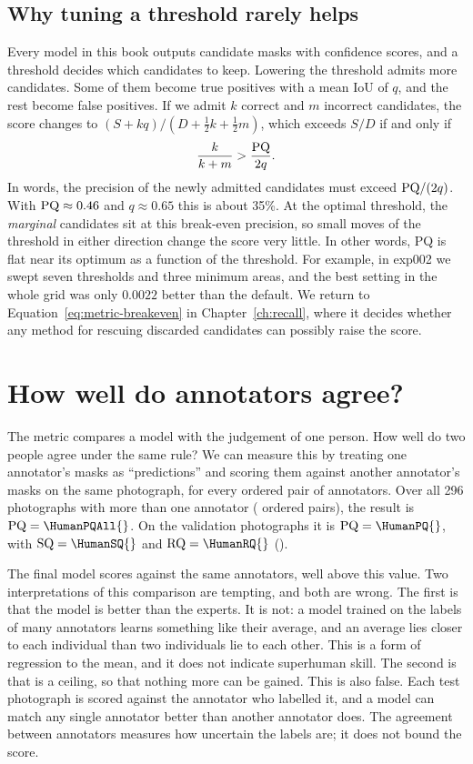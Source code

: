\subsection{Why tuning a threshold rarely helps}\label{sec:metric-threshold}
Every model in this book outputs candidate masks with confidence scores, and a threshold decides
which candidates to keep. Lowering the threshold admits more candidates. Some of them become true
positives with a mean IoU of $q$, and the rest become false positives. If we admit $k$ correct and
$m$ incorrect candidates, the score changes to $(S+kq)/(D+\tfrac12k+\tfrac12m)$, which exceeds
$S/D$ if and only if
\begin{equation}
\frac{k}{k+m}>\frac{\mathrm{PQ}}{2q}.
\label{eq:metric-breakeven}
\end{equation}
In words, the precision of the newly admitted candidates must exceed $\mathrm{PQ}/(2q)$. With
$\mathrm{PQ}\approx0.46$ and $q\approx0.65$ this is about 35\%. At the optimal threshold, the
\emph{marginal} candidates sit at this break-even precision, so small moves of the threshold in
either direction change the score very little. In other words, PQ is flat near its optimum as a
function of the threshold. For example, in exp002 we swept seven thresholds and three minimum
areas, and the best setting in the whole grid was only $0.0022$ better than the default. We return
to Equation~\eqref{eq:metric-breakeven} in Chapter~\ref{ch:recall}, where it decides whether any
method for rescuing discarded candidates can possibly raise the score.

\section{How well do annotators agree?}\label{sec:metric-agreement}
The metric compares a model with the judgement of one person. How well do two people agree under
the same rule? We can measure this by treating one annotator's masks as ``predictions'' and scoring
them against another annotator's masks on the same photograph, for every ordered pair of
annotators. Over all 296 photographs with more than one annotator (\HumanPairs{} ordered pairs),
the result is $\PQ=\HumanPQAll{}$. On the validation photographs it is $\PQ=\HumanPQ{}$, with
$\SQ=\HumanSQ{}$ and $\RQ=\HumanRQ{}$
().

The final model scores \HostPQ{} against the same annotators, well above this value. Two
interpretations of this comparison are tempting, and both are wrong. The first is that the model is
better than the experts. It is not: a model trained on the labels of many annotators learns
something like their average, and an average lies closer to each individual than two individuals
lie to each other. This is a form of regression to the mean, and it does not indicate superhuman
skill. The second is that \HumanPQAll{} is a ceiling, so that nothing more can be gained. This is
also false. Each test photograph is scored against the annotator who labelled it, and a model can
match any single annotator better than another annotator does. The agreement between annotators
measures how uncertain the labels are; it does not bound the score.

